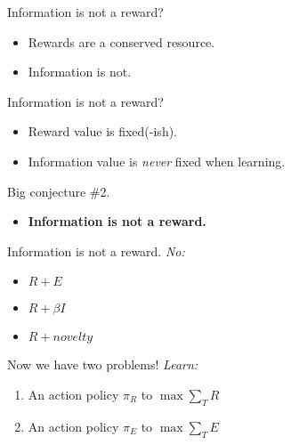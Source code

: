 \documentclass[10pt]{beamer}
\begin{document}
\begin{frame}[fragile]{Information is not a reward?}
\begin{itemize}
    \item Rewards are a conserved resource.
    \item Information is not.
\end{itemize}
\end{frame}

\begin{frame}[fragile]{Information is not a reward?}
\begin{itemize}
    \item Reward value is fixed(-ish).
    \item Information value is \textit{never} fixed when learning.
\end{itemize}
\end{frame}

\begin{frame}[fragile]{Big conjecture \#2.}
\begin{itemize}
    \item \textbf{Information is not a reward.}
\end{itemize}
\end{frame}

\begin{frame}[fragile]{Information is not a reward.}
\textit{No:}
\begin{itemize}
    \item $R + E$
    \item $R + \beta I$
    \item $R + novelty$
\end{itemize}
\end{frame}

\begin{frame}[fragile]{Now we have two problems!}
\textit{Learn:}
\begin{enumerate}
    \item An action policy $\pi_R$ to $\max \sum_T R$
    \item An action policy $\pi_E$ to $\max \sum_T E$
\end{enumerate}
\end{frame}
\end{document}
